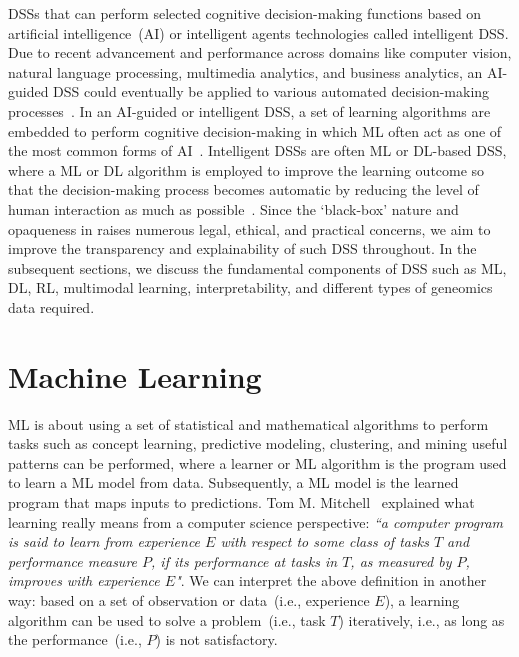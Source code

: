 \hspace*{3.5mm} DSSs that can perform selected cognitive decision-making functions based on artificial intelligence~(AI) or intelligent agents technologies called intelligent DSS. Due to recent advancement and performance across domains like computer vision, natural language processing, multimedia analytics, and business analytics, an AI-guided DSS could eventually be applied to various automated decision-making processes~\cite{davenport2019potential}.  In an AI-guided or intelligent DSS, a set of learning algorithms are embedded to perform cognitive decision-making in which ML often act as one of the most common forms of AI~\cite{das2020opportunities}. Intelligent DSSs are often ML or DL-based DSS, where a ML or DL algorithm is employed to improve the learning outcome so that the decision-making process becomes automatic by reducing the level of human interaction as much as possible~\cite{davenport2019potential}. Since the `black-box' nature and opaqueness in raises numerous legal, ethical, and practical concerns, we aim to improve the transparency and explainability of such DSS throughout. In the subsequent sections, we discuss the fundamental components of DSS such as ML, DL, RL, multimodal learning, interpretability, and different types of geneomics data required. 

\section{Machine Learning}
ML is about using a set of statistical and mathematical algorithms to perform tasks such as concept learning, predictive modeling, clustering, and mining useful patterns can be performed, where a learner or ML algorithm is the program used to learn a ML model from data. Subsequently, a ML model is the learned program that maps inputs to predictions. Tom M. Mitchell~\cite{mitchell1997machine} explained what learning really means from a computer science perspective: \textit{``a computer program is said to learn from experience $E$ with respect to some class of tasks $T$ and performance measure $P$, if its performance at tasks in $T$, as measured by $P$, improves with experience $E$"}. We can interpret the above definition in another way: based on a set of observation or data~(i.e., experience $E$), a learning algorithm can be used to solve a problem~(i.e., task $T$) iteratively, i.e., as long as the performance~(i.e., $P$) is not satisfactory. 

